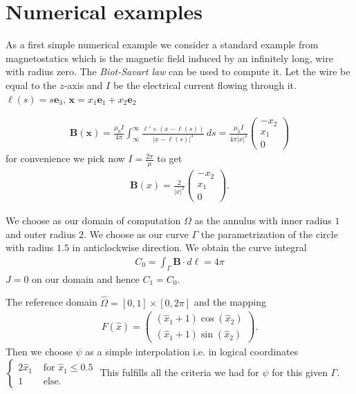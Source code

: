 \documentclass[../master_thesis.tex]{subfiles}
\begin{document}
\section{Numerical examples}

As a first simple numerical example we consider a standard example from 
magnetostatics which is the magnetic field induced by an infinitely long, 
wire with radius zero. The \textit{Biot-Savart law} can be used to compute it. 
Let the wire be equal to the $z$-axis and $I$ be the electrical current 
flowing through it. $\bm{\ell}(s) = s \mathbf{e}_3$, $\mathbf{x} = x_1 \mathbf{e}_1 +  x_2 \mathbf{e}_2$

\begin{align*}
    \mathbf{B}(\mathbf{x}) = \frac{\mu_0 I}{4\pi} \int_\infty^\infty  
        \frac{\ell' \times (x - \ell(s))}{|x - \ell(s)|^3} \, ds
    = \frac{\mu_0 I}{4\pi |x|^2}  \begin{pmatrix}-x_2 \\ x_1 \\ 0 \end{pmatrix}
\end{align*}
for convenience we pick now $I = \frac{2 \pi}{\mu}$ to get 
\begin{align*}
    \mathbf{B}(x) = \frac{2}{|x|^2} \begin{pmatrix}-x_2 \\ x_1 \\ 0 \end{pmatrix}.
\end{align*}

We choose as our domain of computation $\Omega$ as the annulus with 
inner radius $1$ and outer radius $2$.
We choose as our curve $\Gamma$ the parametrization of the circle with radius 
$1.5$ in anticlockwise direction. We obtain the curve integral 
\begin{align*}
    C_0 = \int_\Gamma \mathbf{B}\cdot d\ell = 4\pi
\end{align*}
$J= 0$ on our domain and hence $C_1 = C_0$. 

The reference domain $\hat{\Omega} = [0,1] \times [0, 2\pi]$ and the mapping 
\begin{align*}
    F(\hat{x}) = \begin{pmatrix}
            (\hat{x}_1 + 1)\cos(\hat{x}_2 ) 
            \\ (\hat{x}_1 + 1)\sin(\hat{x}_2 ) 
    \end{pmatrix}.
\end{align*}
Then we choose $\psi$ as a simple interpolation i.e. in logical coordinates 
$\begin{cases}
    2 \hat{x}_1 & \text{ for $\hat{x}_1 \leq 0.5$}
    \\ 1 & \text{ else}.
\end{cases}$
This fulfills all the criteria we had for $\psi$ for this given $\Gamma$. 
\end{document}
